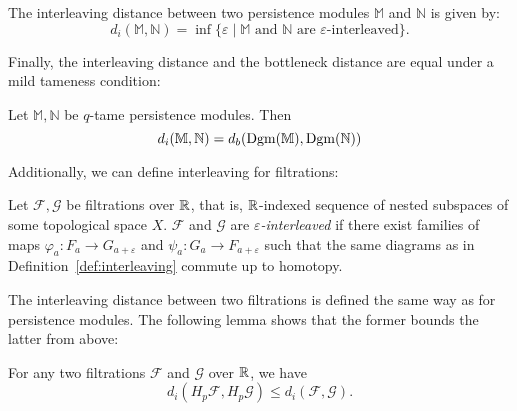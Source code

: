 \begin{definition}
    The interleaving distance between two persistence modules $\mathbb{M}$ and
    $\mathbb{N}$ is given by:
    \begin{equation}
        d_i(\mathbb{M}, \mathbb{N}) = \inf \{\varepsilon \mid \text{$\mathbb{M}$ and $\mathbb{N}$ are $\varepsilon$-interleaved}\}.
    \end{equation}
\end{definition}

Finally, the interleaving distance and the bottleneck distance are equal under a
mild tameness condition:
\begin{theorem}
    Let $\mathbb{M}, \mathbb{N}$ be $q$-tame persistence modules. Then
    \begin{equation}
        d_i(\mathbb{M}, \mathbb{N}) = d_b(\operatorname{Dgm}(\mathbb{M}), \operatorname{Dgm}(\mathbb{N}))
    \end{equation}
\end{theorem}

Additionally, we can define interleaving for filtrations:
\begin{definition}
    Let $\mathcal{F}, \mathcal{G}$ be filtrations over $\mathbb{R}$, that is,
    $\mathbb{R}$-indexed sequence of nested subspaces of some topological space $X$.
    $\mathcal{F}$ and $\mathcal{G}$ are \emph{$\varepsilon$-interleaved}
    if there exist families of maps $\varphi_a : F_a \to G_{a + \varepsilon}$
    and $\psi_a : G_a \to F_{a + \varepsilon}$ such that the same diagrams as in
    Definition~\ref{def:interleaving} commute up to homotopy.
\end{definition}
The interleaving distance between two filtrations is defined the same way as for
persistence modules. The following lemma shows that the former bounds the latter
from above:
\begin{lemma}
    \label{lem:interleaving_distance}
    For any two filtrations $\mathcal{F}$ and $\mathcal{G}$ over $\mathbb{R}$, we
    have
    \begin{equation}
        d_i(H_p \mathcal{F}, H_p \mathcal{G}) \leq d_i(\mathcal{F}, \mathcal{G}).
    \end{equation}
\end{lemma}

